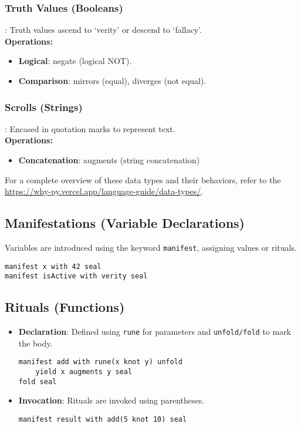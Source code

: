 \documentclass[conference]{IEEEtran}
\begin{document}
\subsubsection{Truth Values (Booleans)}: Truth values ascend to ‘verity’ or descend to ‘fallacy’. \\
\textbf{Operations:}
\begin{itemize}
    \item \textbf{Logical}: negate (logical NOT).
    \item \textbf{Comparison}: mirrors (equal), diverges (not equal).
\end{itemize}

\subsubsection{Scrolls (Strings)}: Encased in quotation marks to represent text. \\
\textbf{Operations:}
\begin{itemize}
    \item \textbf{Concatenation}: augments (string concatenation)
\end{itemize}

For a complete overview of these data types and their behaviors, refer to the \url{https://why-py.vercel.app/language-guide/data-types/}.



\subsection{Manifestations (Variable Declarations)}
Variables are introduced using the keyword \texttt{manifest}, assigning values or rituals.
\begin{lstlisting}
manifest x with 42 seal
manifest isActive with verity seal
\end{lstlisting}

\subsection{Rituals (Functions)}
\begin{itemize}
    \item \textbf{Declaration}: Defined using \texttt{rune} for parameters and \texttt{unfold/fold} to mark the body.
    \begin{lstlisting}
manifest add with rune(x knot y) unfold
    yield x augments y seal
fold seal
    \end{lstlisting}
    \item \textbf{Invocation}: Rituals are invoked using parentheses.
    \begin{lstlisting}
manifest result with add(5 knot 10) seal
    \end{lstlisting}
\end{itemize}
\end{document}
